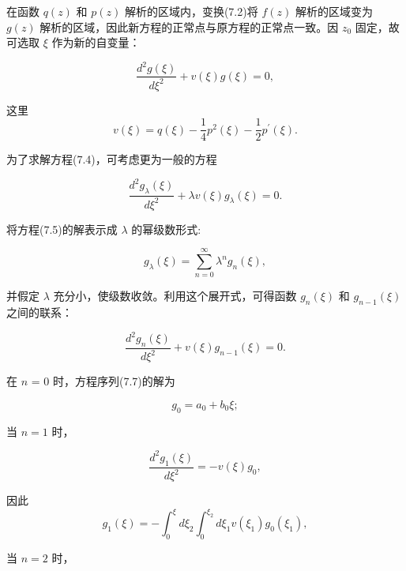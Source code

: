 在函数 $q(z)$ 和 $p(z)$ 解析的区域内，变换(7.2)将 $f(z)$ 解析的区域变为 $g(z)$ 解析的区域，因此新方程的正常点与原方程的正常点一致。因 $z_0$ 固定，故可选取 $\xi$ 作为新的自变量：

\begin{equation*}
\frac {d ^ {2} g (\xi)}{d \xi^ {2}} + v (\xi) g (\xi) = 0,\tag{7.4}
\end{equation*}

这里
\begin{equation*}
v (\xi) = q (\xi) - \frac {1}{4} p ^ {2} (\xi) - \frac {1}{2} p ^ {\prime} (\xi).
\end{equation*}

为了求解方程(7.4)，可考虑更为一般的方程

\begin{equation*}
\frac {d ^ {2} g _ {\lambda} (\xi)}{d \xi^ {2}} + \lambda v (\xi) g _ {\lambda} (\xi) = 0.\tag{7.5}
\end{equation*}

将方程(7.5)的解表示成 $\lambda$ 的幂级数形式:

\begin{equation*}
g _ {\lambda} (\xi) = \sum_ {n = 0} ^ {\infty} \lambda^ {n} g _ {n} (\xi),\tag{7.6}
\end{equation*}

并假定 $\lambda$ 充分小，使级数收敛。利用这个展开式，可得函数 $g_{n}(\xi)$ 和 $g_{n - 1}(\xi)$ 之间的联系：

\begin{equation*}
\frac {d ^ {2} g _ {n} (\xi)}{d \xi^ {2}} + v (\xi) g _ {n - 1} (\xi) = 0.\tag{7.7}
\end{equation*}

在 $n$ = 0 时，方程序列(7.7)的解为

\begin{equation*}
g _ {0} = a _ {0} + b _ {0} \xi ;
\end{equation*}

当 $n = 1$ 时，

\begin{equation*}
\frac {d ^ {2} g _ {1} (\xi)}{d \xi^ {2}} = - v (\xi) g _ {0},
\end{equation*}

因此
\begin{equation*}
g _ {1} (\xi) = - \int_ {0} ^ {\xi} d \xi_ {2} \int_ {0} ^ {\xi_ {2}} d \xi_ {1} v (\xi_ {1}) g _ {0} (\xi_ {1}),
\end{equation*}

当 $n = 2$ 时，

